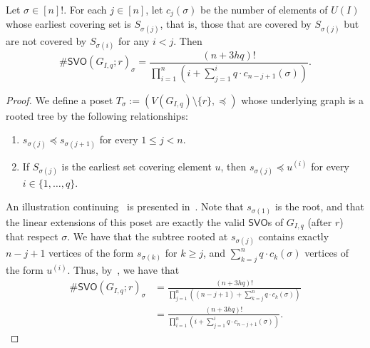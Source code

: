 \documentclass[11pt]{amsart}
\newcommand{\ns}{s}
\begin{document}
\begin{lemma}\label{lemma:svo-formula}
Let $\sigma \in [n]!$. For each $j \in [n]$, let $c_j(\sigma)$ be the number of elements of $U(I)$ whose earliest covering set is $S_{\sigma(j)}$, that is, those that are covered by $S_{\sigma(j)}$ but are not covered by $S_{\sigma(i)}$ for any $i<j$. Then 
\[
    \#\mathsf{SVO}(G_{I, q}; r)_{\sigma} =  \frac{(n+3hq)!}{\prod_{i=1}^n\left( i + \sum_{j=1}^{i} q\cdot c_{n-j+1}(\sigma)\right)}.
    \]
\end{lemma}

\begin{proof}
 We define a poset $T_{\sigma} := (V(G_{I, q}) \setminus \{r\}, \preceq)$ whose underlying graph is a rooted tree by the following relationships:
\begin{enumerate}
    \item $s_{\sigma(j)} \preceq s_{\sigma(j+1)}$ for every $1 \leq j < n$.
    \item If $S_{\sigma(j)}$ is the earliest set covering element $u$, then $s_{\sigma(j)} \preceq u^{(i)}$ for every $i \in\{1, \ldots, q\}$.
\end{enumerate}
An illustration continuing~ is presented in~.
Note that $\ns_{\sigma(1)}$ is the root, and that the linear extensions of this poset are exactly the valid $\mathsf{SVO}$s of $G_{I, q}$ (after $r$) that respect $\sigma$. We have that the subtree rooted at $\ns_{\sigma(j)}$ contains exactly $n-j+1$ vertices of the form $\ns_{\sigma(k)}$ for $k \geq j$, and $\sum_{k=j}^n q \cdot c_{k}(\sigma)$ vertices of the form $u^{(i)}$.
Thus, by~, we have that
\begin{align*}
    \#\mathsf{SVO}(G_{I, q}; r)_{\sigma} &= \frac{(n+3hq)!}{\prod_{j=1}^n\left((n-j+1) + \sum_{k=j}^n q \cdot c_{k}(\sigma)\right)}\\
    &=  \frac{(n+3hq)!}{\prod_{i=1}^n \left(i + \sum_{j=1}^{i} q\cdot c_{n-j+1}(\sigma)\right)} \tag{changing variables}.
\end{align*}
\end{proof}
\end{document}
